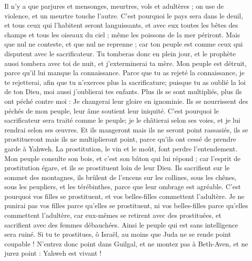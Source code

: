\begin{multicols}{2}
Il n'y a que parjures et mensonges, meurtres, vols et adultères ; on use de violence, et un meurtre touche l'autre.
C'est pourquoi le pays sera dans le deuil, et tous ceux qui l'habitent seront languissants, et avec eux toutes les bêtes des champs et tous les oiseaux du ciel ; même les poissons de la mer périront.
Mais que nul ne conteste, et que nul ne reprenne ; car ton peuple est comme ceux qui disputent avec le sacrificateur.
Tu tomberas donc en plein jour, et le prophète aussi tombera avec toi de nuit, et j'exterminerai ta mère.
Mon peuple est détruit, parce qu'il lui manque la connaissance. Parce que tu as rejeté la connaissance, je te rejetterai, afin que tu n'exerces plus la sacrificature; puisque tu as oublié la loi de ton Dieu, moi aussi j'oublierai tes enfants.
Plus ils se sont multipliés, plus ils ont péché contre moi : Je changerai leur gloire en ignominie.
Ils se nourrissent des péchés de mon peuple, leur âme soutient leur iniquité.
C'est pourquoi le sacrificateur sera traité comme le peuple; je le châtierai selon ses voies, et je lui rendrai selon ses œuvres.
Et ils mangeront mais ils ne seront point rassasiés, ils se prostitueront mais ils ne multiplieront point, parce qu'ils ont cessé de prendre garde à Yahweh.
La prostitution, le vin et le moût, font perdre l'entendement.
Mon peuple consulte son bois, et c'est son bâton qui lui répond ; car l'esprit de prostitution égare, et ils se prostituent loin de leur Dieu.
Ils sacrifient sur le sommet des montagnes, ils brûlent de l'encens sur les collines, sous les chênes, sous les peupliers, et les térébinthes, parce que leur ombrage est agréable. C'est pourquoi vos filles se prostituent, et vos belles-filles commettent l'adultère.
Je ne punirai pas vos filles parce qu'elles se prostituent, ni vos belles-filles parce qu'elles commettent l'adultère, car eux-mêmes se retirent avec des prostituées, et sacrifient avec des femmes débauchées. Ainsi le peuple qui est sans intelligence sera ruiné.
Si tu te prostitues, ô Israël, au moins que Juda ne se rende point coupable ! N'entrez donc point dans Guilgal, et ne montez pas à Beth-Aven, et ne jurez point : Yahweh est vivant !

\end{multicols}
